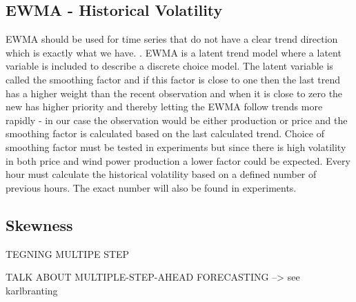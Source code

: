 \subsection{EWMA - Historical Volatility}
\label{sec:ewmaVolatility}

EWMA should be used for time series that do not have a clear trend direction\cite[Chapter~7.3.2]{econometrics} which is exactly what we have. . EWMA is a latent trend model where a latent variable is included to describe a discrete choice model. The latent variable is called the smoothing factor and if this factor is close to one then the last trend has a higher weight than the recent observation and when it is close to zero the new has higher priority and thereby letting the EWMA follow trends more rapidly - in our case the observation would be either production or price and the smoothing factor is calculated based on the last calculated trend. Choice of smoothing factor must be tested in experiments but since there is high volatility in both price and wind power production a lower factor could be expected. Every hour must calculate the historical volatility based on a defined number of previous hours. The exact number will also be found in experiments.

\subsection{Skewness}
\label{sec:skewness}



TEGNING MULTIPE STEP

TALK ABOUT MULTIPLE-STEP-AHEAD FORECASTING --> see karlbranting
